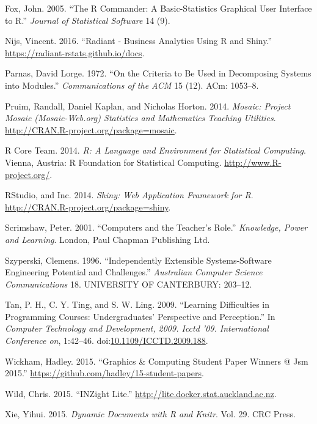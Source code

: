 \documentclass[12pt,]{article}
\begin{document}
\hypertarget{ref-fox2005}{}
Fox, John. 2005. ``The R Commander: A Basic-Statistics Graphical User
Interface to R.'' \emph{Journal of Statistical Software} 14 (9).

\hypertarget{ref-radiant}{}
Nijs, Vincent. 2016. ``Radiant - Business Analytics Using R and Shiny.''
\url{https://radiant-rstats.github.io/docs}.

\hypertarget{ref-parnas1972criteria}{}
Parnas, David Lorge. 1972. ``On the Criteria to Be Used in Decomposing
Systems into Modules.'' \emph{Communications of the ACM} 15 (12). ACm:
1053--8.

\hypertarget{ref-mosaic}{}
Pruim, Randall, Daniel Kaplan, and Nicholas Horton. 2014. \emph{Mosaic:
Project Mosaic (Mosaic-Web.org) Statistics and Mathematics Teaching
Utilities}. \url{http://CRAN.R-project.org/package=mosaic}.

\hypertarget{ref-r-stat}{}
R Core Team. 2014. \emph{R: A Language and Environment for Statistical
Computing}. Vienna, Austria: R Foundation for Statistical Computing.
\url{http://www.R-project.org/}.

\hypertarget{ref-shiny}{}
RStudio, and Inc. 2014. \emph{Shiny: Web Application Framework for R}.
\url{http://CRAN.R-project.org/package=shiny}.

\hypertarget{ref-scrimshaw2001computers}{}
Scrimshaw, Peter. 2001. ``Computers and the Teacher's Role.''
\emph{Knowledge, Power and Learning}. London, Paul Chapman Publishing
Ltd.

\hypertarget{ref-szyperski1996independently}{}
Szyperski, Clemens. 1996. ``Independently Extensible Systems-Software
Engineering Potential and Challenges.'' \emph{Australian Computer
Science Communications} 18. UNIVERSITY OF CANTERBURY: 203--12.

\hypertarget{ref-5359977}{}
Tan, P. H., C. Y. Ting, and S. W. Ling. 2009. ``Learning Difficulties in
Programming Courses: Undergraduates' Perspective and Perception.'' In
\emph{Computer Technology and Development, 2009. Icctd '09.
International Conference on}, 1:42--46.
doi:\href{https://doi.org/10.1109/ICCTD.2009.188}{10.1109/ICCTD.2009.188}.

\hypertarget{ref-interpolate}{}
Wickham, Hadley. 2015. ``Graphics \& Computing Student Paper Winners @
Jsm 2015.'' \url{https://github.com/hadley/15-student-papers}.

\hypertarget{ref-inzight}{}
Wild, Chris. 2015. ``INZight Lite.''
\url{http://lite.docker.stat.auckland.ac.nz}.

\hypertarget{ref-xie2015}{}
Xie, Yihui. 2015. \emph{Dynamic Documents with R and Knitr}. Vol. 29.
CRC Press.
\end{document}
